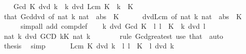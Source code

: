 \begin{isabellebody}
\ \ \isamarkupfalse%
\ {\isachardoublequoteopen}Gcd\ K\ dvd\ k{\isachardoublequoteclose}\ \ {\isachardoublequoteopen}k\ dvd\ Lcm\ K{\isachardoublequoteclose}\ \ {\isachardoublequoteopen}k\ {\isasymin}\ K{\isachardoublequoteclose}\isanewline
\ \ \ \ \isamarkupfalse%
\ that\ Gcd{\isacharunderscore}{\kern0pt}dvd\ {\isacharbrackleft}{\kern0pt}of\ {\isachardoublequoteopen}nat\ {\isasymbar}k{\isasymbar}{\isachardoublequoteclose}\ {\isachardoublequoteopen}{\isacharparenleft}{\kern0pt}nat\ {\isasymcirc}\ abs{\isacharparenright}{\kern0pt}\ {\isacharbackquote}{\kern0pt}\ K{\isachardoublequoteclose}{\isacharbrackright}{\kern0pt}\isanewline
\ \ \ \ \ \ dvd{\isacharunderscore}{\kern0pt}Lcm\ {\isacharbrackleft}{\kern0pt}of\ {\isachardoublequoteopen}nat\ {\isasymbar}k{\isasymbar}{\isachardoublequoteclose}\ {\isachardoublequoteopen}{\isacharparenleft}{\kern0pt}nat\ {\isasymcirc}\ abs{\isacharparenright}{\kern0pt}\ {\isacharbackquote}{\kern0pt}\ K{\isachardoublequoteclose}{\isacharbrackright}{\kern0pt}\isanewline
\ \ \ \ \isamarkupfalse%
\ {\isacharparenleft}{\kern0pt}simp{\isacharunderscore}{\kern0pt}all\ add{\isacharcolon}{\kern0pt}\ comp{\isacharunderscore}{\kern0pt}def{\isacharparenright}{\kern0pt}\isanewline
\ \ \isamarkupfalse%
\ {\isachardoublequoteopen}k\ dvd\ Gcd\ K{\isachardoublequoteclose}\ \ {\isachardoublequoteopen}{\isasymAnd}l{\isachardot}{\kern0pt}\ l\ {\isasymin}\ K\ {\isasymLongrightarrow}\ k\ dvd\ l{\isachardoublequoteclose}\isanewline
\ \ \isamarkupfalse%
\ {\isacharminus}{\kern0pt}\isanewline
\ \ \ \ \isamarkupfalse%
\ {\isachardoublequoteopen}nat\ {\isasymbar}k{\isasymbar}\ dvd\ {\isacharparenleft}{\kern0pt}GCD\ k{\isasymin}K{\isachardot}{\kern0pt}\ nat\ {\isasymbar}k{\isasymbar}{\isacharparenright}{\kern0pt}{\isachardoublequoteclose}\isanewline
\ \ \ \ \ \ \isamarkupfalse%
\ {\isacharparenleft}{\kern0pt}rule\ Gcd{\isacharunderscore}{\kern0pt}greatest{\isacharparenright}{\kern0pt}\ {\isacharparenleft}{\kern0pt}use\ that\ \ auto{\isacharparenright}{\kern0pt}\isanewline
\ \ \ \ \isamarkupfalse%
\ \isamarkupfalse%
\ {\isacharquery}{\kern0pt}thesis\ \isamarkupfalse%
\ simp\isanewline
\ \ \isamarkupfalse%
\isanewline
\ \ \isamarkupfalse%
\ {\isachardoublequoteopen}Lcm\ K\ dvd\ k{\isachardoublequoteclose}\ \ {\isachardoublequoteopen}{\isasymAnd}l{\isachardot}{\kern0pt}\ l\ {\isasymin}\ K\ {\isasymLongrightarrow}\ l\ dvd\ k{\isachardoublequoteclose}\isanewline

\end{isabellebody}
